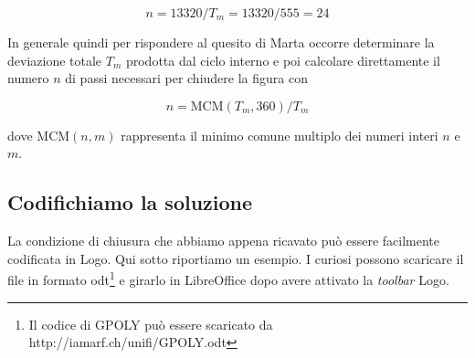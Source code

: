 \begin{equation}
\label{eq-chiusura-4}
n=13320/T_m=13320/555=24
\end{equation}

In generale quindi per rispondere al quesito di Marta occorre determinare la deviazione totale $T_m$ prodotta dal ciclo interno e poi calcolare direttamente il numero $n$ di passi necessari per chiudere la figura con

\begin{equation}
\label{eq-chiusura-5}
n=\mathrm{MCM}(T_m,360)/T_m
\end{equation}

dove $\mathrm{MCM}(n,m)$ rappresenta il minimo comune multiplo dei numeri interi $n$ e $m$. 

\subsection{Codifichiamo la soluzione}

La condizione di chiusura che abbiamo appena ricavato può essere facilmente codificata in Logo. Qui sotto riportiamo un esempio. I curiosi possono scaricare il file in formato odt\footnote{Il codice di GPOLY può essere scaricato da http://iamarf.ch/unifi/GPOLY.odt} e girarlo in LibreOffice dopo avere attivato la \textit{toolbar} Logo.

